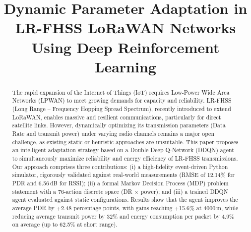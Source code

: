 \documentclass[conference]{IEEEtran}
\begin{document}
	
	\title{Dynamic Parameter Adaptation in LR-FHSS LoRaWAN Networks\\Using Deep Reinforcement Learning}
	
	\author{
		\and
		\and
		\and
	}
	
	\maketitle
	
	\begin{abstract}
		The rapid expansion of the Internet of Things (IoT) requires Low-Power Wide
		Area Networks (LPWAN) to meet growing demands for capacity and reliability.
		LR-FHSS (Long Range -- Frequency Hopping Spread Spectrum), recently introduced
		to extend LoRaWAN, enables massive and resilient communications, particularly
		for direct satellite links. However, dynamically optimizing its transmission
		parameters (Data Rate and transmit power) under varying radio channels remains
		a major open challenge, as existing static or heuristic approaches are
		unsuitable. This paper proposes an intelligent adaptation strategy based on a
		Double Deep Q-Network (DDQN) agent to simultaneously maximize reliability and
		energy efficiency of LR-FHSS transmissions. Our approach comprises three
		contributions: (i) a high-fidelity event-driven Python simulator, rigorously
		validated against real-world measurements (RMSE of 12.14\% for PDR and
		6.56\,dB for RSSI); (ii) a formal Markov Decision Process (MDP) problem
		statement with a 76-action discrete space (DR $\times$ power); and (iii) a
		trained DDQN agent evaluated against static configurations. Results show that
		the agent improves the average PDR by +2.48 percentage points, with gains
		reaching +15.6\% at 4000\,m, while reducing average transmit power by 32\%
		and energy consumption per packet by 4.9\% on average (up to 62.5\% at short
		range).
	\end{abstract}
	
\end{document}
